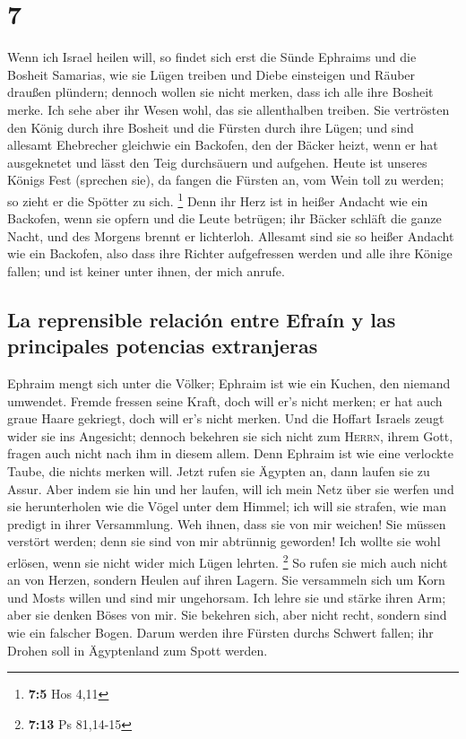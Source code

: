 \hypertarget{section-6}{%
\section{7}\label{section-6}}

 Wenn ich Israel heilen will, so findet sich erst die
Sünde Ephraims und die Bosheit Samarias, wie sie Lügen treiben und Diebe
einsteigen und Räuber draußen plündern;  dennoch wollen
sie nicht merken, dass ich alle ihre Bosheit merke. Ich sehe aber ihr
Wesen wohl, das sie allenthalben treiben.  Sie vertrösten
den König durch ihre Bosheit und die Fürsten durch ihre Lügen;
 und sind allesamt Ehebrecher gleichwie ein Backofen, den
der Bäcker heizt, wenn er hat ausgeknetet und lässt den Teig durchsäuern
und aufgehen.  Heute ist unseres Königs Fest (sprechen
sie), da fangen die Fürsten an, vom Wein toll zu werden; so zieht er die
Spötter zu sich. \footnote{\textbf{7:5} Hos 4,11}  Denn
ihr Herz ist in heißer Andacht wie ein Backofen, wenn sie opfern und die
Leute betrügen; ihr Bäcker schläft die ganze Nacht, und des Morgens
brennt er lichterloh.  Allesamt sind sie so heißer Andacht
wie ein Backofen, also dass ihre Richter aufgefressen werden und alle
ihre Könige fallen; und ist keiner unter ihnen, der mich anrufe.

\hypertarget{la-reprensible-relaciuxf3n-entre-efrauxedn-y-las-principales-potencias-extranjeras}{%
\subsection{La reprensible relación entre Efraín y las principales
potencias
extranjeras}\label{la-reprensible-relaciuxf3n-entre-efrauxedn-y-las-principales-potencias-extranjeras}}

 Ephraim mengt sich unter die Völker; Ephraim ist wie ein
Kuchen, den niemand umwendet.  Fremde fressen seine Kraft,
doch will er's nicht merken; er hat auch graue Haare gekriegt, doch will
er's nicht merken.  Und die Hoffart Israels zeugt wider
sie ins Angesicht; dennoch bekehren sie sich nicht zum \textsc{Herrn},
ihrem Gott, fragen auch nicht nach ihm in diesem allem. 
Denn Ephraim ist wie eine verlockte Taube, die nichts merken will. Jetzt
rufen sie Ägypten an, dann laufen sie zu Assur.  Aber
indem sie hin und her laufen, will ich mein Netz über sie werfen und sie
herunterholen wie die Vögel unter dem Himmel; ich will sie strafen, wie
man predigt in ihrer Versammlung.  Weh ihnen, dass sie
von mir weichen! Sie müssen verstört werden; denn sie sind von mir
abtrünnig geworden! Ich wollte sie wohl erlösen, wenn sie nicht wider
mich Lügen lehrten. \footnote{\textbf{7:13} Ps 81,14-15} 
So rufen sie mich auch nicht an von Herzen, sondern Heulen auf ihren
Lagern. Sie versammeln sich um Korn und Mosts willen und sind mir
ungehorsam.  Ich lehre sie und stärke ihren Arm; aber sie
denken Böses von mir.  Sie bekehren sich, aber nicht
recht, sondern sind wie ein falscher Bogen. Darum werden ihre Fürsten
durchs Schwert fallen; ihr Drohen soll in Ägyptenland zum Spott werden.

